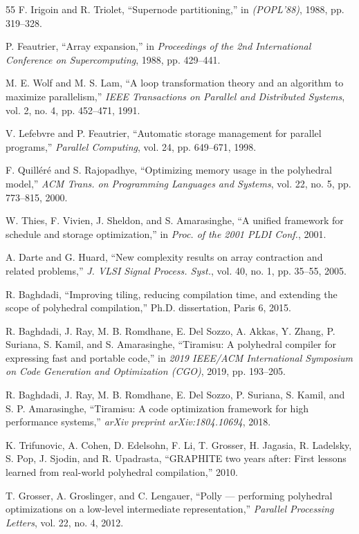 \documentclass[10pt,twocolumn]{article}
\begin{document}
\begin{thebibliography}{55}
 F. Irigoin and R. Triolet, ``Supernode partitioning,'' in \emph{(POPL'88)}, 1988, pp. 319--328.

 P. Feautrier, ``Array expansion,'' in \emph{Proceedings of the 2nd International Conference on Supercomputing}, 1988, pp. 429--441.

 M. E. Wolf and M. S. Lam, ``A loop transformation theory and an algorithm to maximize parallelism,'' \emph{IEEE Transactions on Parallel and Distributed Systems}, vol. 2, no. 4, pp. 452--471, 1991.

 V. Lefebvre and P. Feautrier, ``Automatic storage management for parallel programs,'' \emph{Parallel Computing}, vol. 24, pp. 649--671, 1998.

 F. Quill\'er\'e and S. Rajopadhye, ``Optimizing memory usage in the polyhedral model,'' \emph{ACM Trans. on Programming Languages and Systems}, vol. 22, no. 5, pp. 773--815, 2000.

 W. Thies, F. Vivien, J. Sheldon, and S. Amarasinghe, ``A unified framework for schedule and storage optimization,'' in \emph{Proc. of the 2001 PLDI Conf.}, 2001.

 A. Darte and G. Huard, ``New complexity results on array contraction and related problems,'' \emph{J. VLSI Signal Process. Syst.}, vol. 40, no. 1, pp. 35--55, 2005.

 R. Baghdadi, ``Improving tiling, reducing compilation time, and extending the scope of polyhedral compilation,'' Ph.D. dissertation, Paris 6, 2015.

 R. Baghdadi, J. Ray, M. B. Romdhane, E. Del Sozzo, A. Akkas, Y. Zhang, P. Suriana, S. Kamil, and S. Amarasinghe, ``Tiramisu: A polyhedral compiler for expressing fast and portable code,'' in \emph{2019 IEEE/ACM International Symposium on Code Generation and Optimization (CGO)}, 2019, pp. 193--205.

 R. Baghdadi, J. Ray, M. B. Romdhane, E. Del Sozzo, P. Suriana, S. Kamil, and S. P. Amarasinghe, ``Tiramisu: A code optimization framework for high performance systems,'' \emph{arXiv preprint arXiv:1804.10694}, 2018.

 K. Trifunovic, A. Cohen, D. Edelsohn, F. Li, T. Grosser, H. Jagasia, R. Ladelsky, S. Pop, J. Sjodin, and R. Upadrasta, ``GRAPHITE two years after: First lessons learned from real-world polyhedral compilation,'' 2010.

 T. Grosser, A. Groslinger, and C. Lengauer, ``Polly --- performing polyhedral optimizations on a low-level intermediate representation,'' \emph{Parallel Processing Letters}, vol. 22, no. 4, 2012.


\end{thebibliography}
\end{document}
